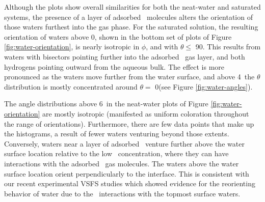 
Although the plots show overall similarities for both the neat-water and saturated systems, the presence of a layer of adsorbed \suldiox~molecules alters the orientation of those waters furthest into the gas phase. For the saturated solution, the resulting orientation of waters above 0\angs, shown in the bottom set of plots of Figure \ref{fig:water-orientation}, is nearly isotropic in $\phi$, and with $\theta \leq$ 90\textdegree. This results from waters with bisectors pointing further into the adsorbed \suldiox~gas layer, and both hydrogens pointing outward from the aqueous bulk. The effect is more pronounced as the waters move further from the water surface, and above 4\angs~the $\theta$ distribution is mostly concentrated around $\theta=$ 0\textdegree (see Figure \ref{fig:water-angles}).


The angle distributions above 6\angs~in the neat-water plots of Figure \ref{fig:water-orientation} are mostly isotropic (manifested as uniform coloration throughout the range of orientations). Furthermore, there are few data points that make up the histograms, a result of fewer waters venturing beyond those extents. Conversely, waters near a layer of adsorbed \suldiox~venture further above the water surface location relative to the low \suldiox~concentration, where they can have interactions with the adsorbed \suldiox~gas molecules. The waters above the water surface location orient perpendicularly to the interface. This is consistent with our recent experimental VSFS studies which showed evidence for the reorienting behavior of water due to the \suldiox~interactions with the topmost surface waters.\cite{Ota2011}

